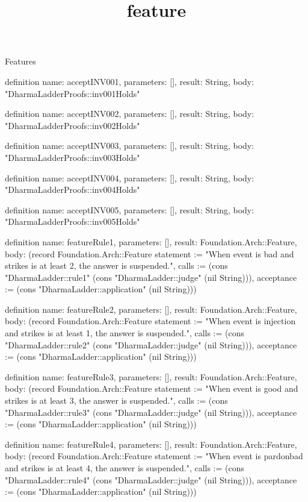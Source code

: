 \begin{lexlean}{Features}
\title{feature}
\begin{semanticmodule}
definition{
  name: acceptINV001,
  parameters: [],
  result: String,
  body: "DharmaLadderProofs::inv001Holds"
}

definition{
  name: acceptINV002,
  parameters: [],
  result: String,
  body: "DharmaLadderProofs::inv002Holds"
}

definition{
  name: acceptINV003,
  parameters: [],
  result: String,
  body: "DharmaLadderProofs::inv003Holds"
}

definition{
  name: acceptINV004,
  parameters: [],
  result: String,
  body: "DharmaLadderProofs::inv004Holds"
}

definition{
  name: acceptINV005,
  parameters: [],
  result: String,
  body: "DharmaLadderProofs::inv005Holds"
}

definition{
  name: featureRule1,
  parameters: [],
  result: Foundation.Arch::Feature,
  body: (record Foundation.Arch::Feature {statement := "When event is bad and strikes is at least 2, the answer is suspended.", calls := (cons "DharmaLadder::rule1" (cons "DharmaLadder::judge" (nil String))), acceptance := (cons "DharmaLadder::application" (nil String))})
}

definition{
  name: featureRule2,
  parameters: [],
  result: Foundation.Arch::Feature,
  body: (record Foundation.Arch::Feature {statement := "When event is injection and strikes is at least 1, the answer is suspended.", calls := (cons "DharmaLadder::rule2" (cons "DharmaLadder::judge" (nil String))), acceptance := (cons "DharmaLadder::application" (nil String))})
}

definition{
  name: featureRule3,
  parameters: [],
  result: Foundation.Arch::Feature,
  body: (record Foundation.Arch::Feature {statement := "When event is good and strikes is at least 3, the answer is suspended.", calls := (cons "DharmaLadder::rule3" (cons "DharmaLadder::judge" (nil String))), acceptance := (cons "DharmaLadder::application" (nil String))})
}

definition{
  name: featureRule4,
  parameters: [],
  result: Foundation.Arch::Feature,
  body: (record Foundation.Arch::Feature {statement := "When event is pardonbad and strikes is at least 4, the answer is suspended.", calls := (cons "DharmaLadder::rule4" (cons "DharmaLadder::judge" (nil String))), acceptance := (cons "DharmaLadder::application" (nil String))})
}


\end{semanticmodule}
\end{lexlean}
